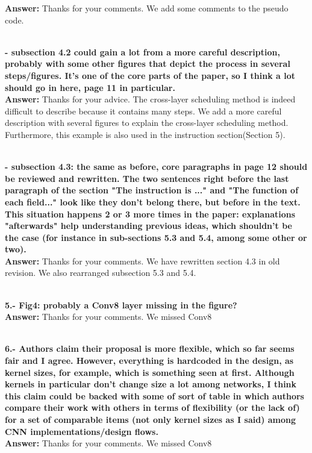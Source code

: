 \documentclass[12pt]{paper}
\newcommand{\rev}[1]{{{\color[rgb]{0,0,1}{#1}}}}
\newcommand{\answer}[1]{\noindent\textbf{Answer:} #1}
\newcommand{\comment}[1]{\noindent\textbf{\\ #1}\\}
\begin{document}
\answer{Thanks for your comments. We add some comments to the pseudo code. \\
}
\rev{We add comments in the Algorithm 3 to make the pseudo code easier to understand. In fact, the +2 in rows is resulted from Winograd transformation. Similarity at line 7, the +2 in col is also resulted from Winograd, and we add comment for line 7.}


\comment{- subsection 4.2 could gain a lot from a more careful description, probably with some other figures that depict the process in several steps/figures. It's one of the core parts of the paper, so I think a lot should go in here, page 11 in particular.}

\answer{Thanks for your advice. The cross-layer scheduling method is indeed difficult to describe because it contains many steps. We add a more careful description with several figures to explain the cross-layer scheduling method. \\
}
\rev{We have redrawn fig 5 to illustrate each step of a example CNN with only two layers. We also have changed the paragraphs describing this example.}
Furthermore, this example is also used in the instruction section(Section 5).

\comment{- subsection 4.3: the same as before, core paragraphs in page 12 should be reviewed and rewritten. The two sentences right before the last paragraph of the section "The instruction is ..." and "The function of each field..." look like they don't belong there, but before in the text. This situation happens 2 or 3 more times in the paper: explanations "afterwards" help understanding previous ideas, which shouldn't be the case (for instance in sub-sections 5.3 and 5.4, among some other or two). 
}
\answer{Thanks for your comments. We have rewritten section 4.3  in old revision. We also rearranged subsection 5.3 and 5.4.\\}
\rev{We have moved subsection 4.3 to a new section(Section 6), and have rewritten all the section with more detials and two code examples for the examples in fig 5. We have merged subsection 5.3, 5.4 and 5.5 to discribe the key idea of our data buffer design.}

\comment{5.- Fig4: probably a Conv8 layer missing in the figure? }
\answer{Thanks for your comments. We missed Conv8}
\rev{We have rewritten this figure and fixed this error.}

\comment{6.- Authors claim their proposal is more flexible, which so far seems fair and I agree. However, everything is hardcoded in the design, as kernel sizes, for example, which is something seen at first. Although kernels in particular don't change size a lot among networks, I think this claim could be backed with some of sort of table in which authors compare their work with others in terms of flexibility (or the lack of) for a set of comparable items (not only kernel sizes as I said) among CNN implementations/design flows. }
\answer{Thanks for your comments. We missed Conv8}
\end{document}
